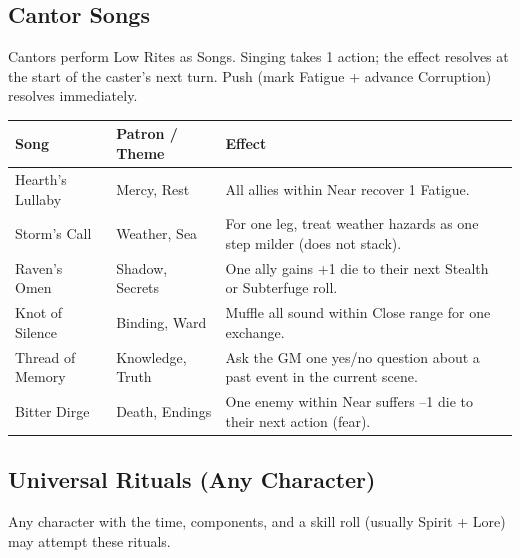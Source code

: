 \subsection{Cantor Songs}

Cantors perform Low Rites as Songs. Singing takes 1 action; the effect resolves at the start of the caster's next turn. Push (mark Fatigue + advance Corruption) resolves immediately.

\begin{tabular}{@{}l>{\raggedright\arraybackslash}p{3cm}>{\raggedright\arraybackslash}p{7cm}@{}}
\toprule
\textbf{Song} & \textbf{Patron / Theme} & \textbf{Effect} \\
\midrule
Hearth's Lullaby & Mercy, Rest & All allies within Near recover 1 Fatigue. \\
Storm's Call & Weather, Sea & For one leg, treat weather hazards as one step milder (does not stack). \\
Raven's Omen & Shadow, Secrets & One ally gains +1 die to their next Stealth or Subterfuge roll. \\
Knot of Silence & Binding, Ward & Muffle all sound within Close range for one exchange. \\
Thread of Memory & Knowledge, Truth & Ask the GM one yes/no question about a past event in the current scene. \\
Bitter Dirge & Death, Endings & One enemy within Near suffers --1 die to their next action (fear). \\
\bottomrule
\end{tabular}

\subsection{Universal Rituals (Any Character)}

Any character with the time, components, and a skill roll (usually Spirit + Lore) may attempt these rituals.

